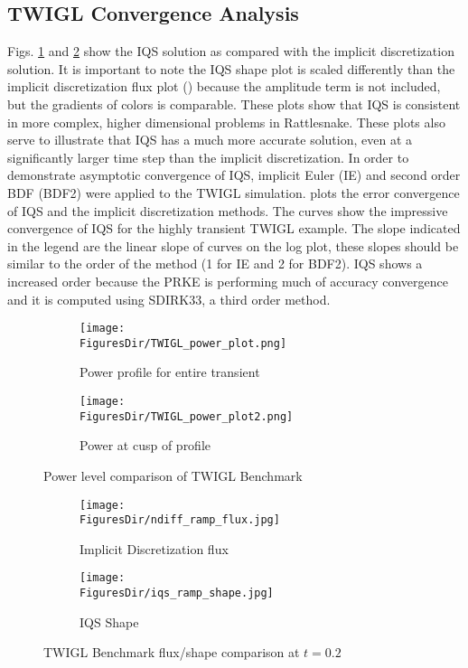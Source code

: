 \subsection{TWIGL Convergence Analysis}


Figs. \ref{fig:TWIGL_power} and \ref{fig:TWIGL_plots} show the IQS  solution as compared with the implicit discretization solution.  It is important to note the IQS shape plot is scaled differently than the implicit discretization flux plot () because the amplitude term is not included, but the gradients of colors is comparable. These plots show that IQS is consistent in more complex, higher dimensional problems in Rattlesnake. These plots also serve to illustrate that IQS has a much more accurate solution, even at a significantly larger time step than the implicit discretization. In order to demonstrate asymptotic convergence of IQS, implicit Euler (IE) and second order BDF (BDF2) were applied to the TWIGL simulation.  plots the error convergence of IQS and the implicit discretization methods.  The curves show the impressive convergence of IQS for the highly transient TWIGL example. The slope indicated in the legend are the linear slope of curves on the log plot, these slopes should be similar to the order of the method (1 for IE and 2 for BDF2).  IQS shows a increased order because the PRKE is performing much of accuracy convergence and it is computed using SDIRK33, a third order method.

\begin{figure}[!htbp]
\centering
\begin{subfigure}[!htbp]{0.49\textwidth}
\texttt{[image: \\FiguresDir/TWIGL\_power\_plot.png]}
\caption{Power profile for entire transient}
\end{subfigure}
\begin{subfigure}[!htbp]{0.49\textwidth}
\texttt{[image: \\FiguresDir/TWIGL\_power\_plot2.png]}
\caption{Power at cusp of profile}
\end{subfigure}
\caption{Power level comparison of TWIGL Benchmark}
\label{fig:TWIGL_power}
\end{figure}

\begin{figure}[!htbp]
\begin{center}
\begin{subfigure}[!htbp]{0.4\textwidth}
\texttt{[image: \\FiguresDir/ndiff\_ramp\_flux.jpg]}
\caption{Implicit Discretization flux}
\end{subfigure}
\quad
\begin{subfigure}[!htbp]{0.4\textwidth}
\texttt{[image: \\FiguresDir/iqs\_ramp\_shape.jpg]}
\caption{IQS Shape}
\end{subfigure}
\caption{TWIGL Benchmark flux/shape comparison at $t=0.2$ \cite{PrincePHYSOR2016}}
\label{fig:TWIGL_plots}
\end{center}
\end{figure}


